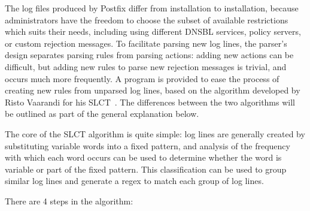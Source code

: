 The log files produced by Postfix differ from installation to installation,
because administrators have the freedom to choose the subset of available
restrictions which suits their needs, including using different \gls{DNSBL}
services, policy servers, or custom rejection messages.  To facilitate
parsing new log lines, the parser's design separates parsing rules from
parsing actions: adding new actions can be difficult, but adding new rules
to parse new rejection messages is trivial, and occurs much more
frequently.  A program is provided to ease the process of creating new
rules from unparsed log lines, based on the algorithm developed by Risto
Vaarandi for his \gls{SLCT}~\cite{slct-paper}.  The differences between the
two algorithms will be outlined as part of the general explanation below.

The core of the \gls{SLCT} algorithm is quite simple: log lines are
generally created by substituting variable words into a fixed pattern, and
analysis of the frequency with which each word occurs can be used to
determine whether the word is variable or part of the fixed pattern.  This
classification can be used to group similar log lines and generate a regex
to match each group of log lines.

There are 4 steps in the algorithm:

